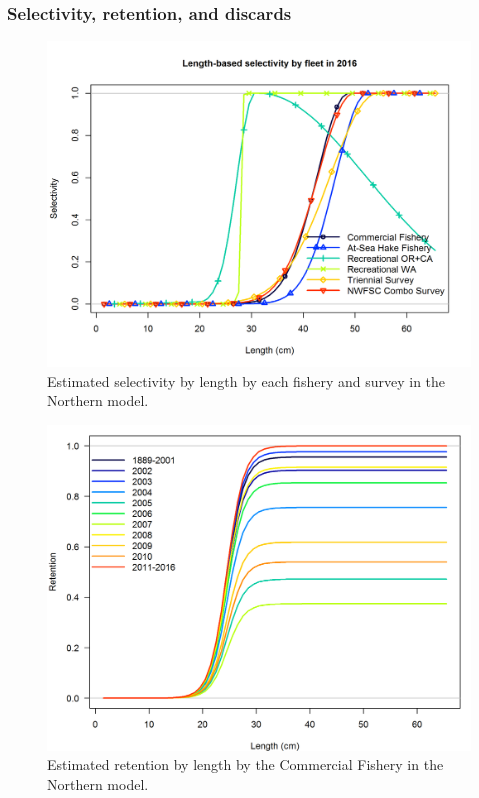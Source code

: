 \documentclass[12pt,]{article}
\begin{document}
\FloatBarrier

\subsubsection{Selectivity, retention, and
discards}\label{selectivity-retention-and-discards}

\begin{figure}[htbp]
\centering
\includegraphics{r4ss/plots_mod1/sel01_multiple_fleets_length1.png}
\caption{Estimated selectivity by length by each fishery and survey in
the Northern model. \label{fig:selex}}
\end{figure}

\begin{figure}[htbp]
\centering
\includegraphics{r4ss/plots_mod1/time-varying_retention.png}
\caption{Estimated retention by length by the Commercial Fishery in the
Northern model. \label{fig:retention}}
\end{figure}
\end{document}
